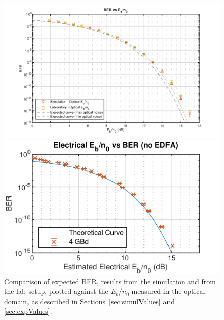 	\begin{figure}[H]
		\centering
		\begin{minipage}{0.45\textwidth}
			\centering
			\includegraphics[width=1\textwidth]
			{./sdf/m_qam_system/figures/experimental/results/4GBd_noEDFA/ebn0Curve_sim4_final.pdf}
			\subcaption{\label{fig:4GBdBERH}}
		\end{minipage}
		\begin{minipage}{0.45\textwidth}
			\centering
			\includegraphics[width=1\textwidth]
			{./sdf/m_qam_system/figures/experimental/results/4GBd_noEDFA/ebn0Curve_lab4_noEDFA_181204.pdf}
			\subcaption{\label{fig:4GBdBERHnoEDFA}}
		\end{minipage}
		\caption{Comparison of expected BER, results from the simulation and from
			the lab setup, plotted against the $E_b/n_0$ measured in the optical
			domain, as described in Sections~\ref{sec:simulValues} and
		\ref{sec:expValues}.\label{fig:4GBdBERH2}}
	\end{figure}

